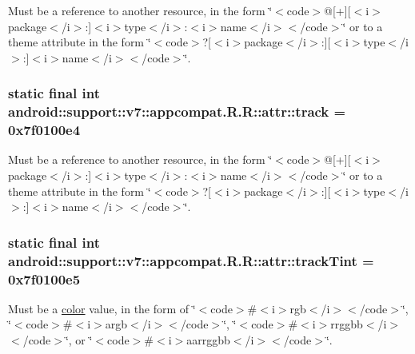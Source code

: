 Must be a reference to another resource, in the form \char`\"{}$<$code$>$@\mbox{[}+\mbox{]}\mbox{[}$<$i$>$package$<$/i$>$:\mbox{]}$<$i$>$type$<$/i$>$:$<$i$>$name$<$/i$>$$<$/code$>$\char`\"{} or to a theme attribute in the form \char`\"{}$<$code$>$?\mbox{[}$<$i$>$package$<$/i$>$:\mbox{]}\mbox{[}$<$i$>$type$<$/i$>$:\mbox{]}$<$i$>$name$<$/i$>$$<$/code$>$\char`\"{}. \hypertarget{classandroid_1_1support_1_1v7_1_1appcompat_1_1_r_1_1attr_1c6c319b2b5a130b26a8bdc55da06266}{
\subsubsection[{track}]{\setlength{\rightskip}{0pt plus 5cm}static final int android::support::v7::appcompat.R.R::attr::track = 0x7f0100e4}}
\label{classandroid_1_1support_1_1v7_1_1appcompat_1_1_r_1_1attr_1c6c319b2b5a130b26a8bdc55da06266}


Must be a reference to another resource, in the form \char`\"{}$<$code$>$@\mbox{[}+\mbox{]}\mbox{[}$<$i$>$package$<$/i$>$:\mbox{]}$<$i$>$type$<$/i$>$:$<$i$>$name$<$/i$>$$<$/code$>$\char`\"{} or to a theme attribute in the form \char`\"{}$<$code$>$?\mbox{[}$<$i$>$package$<$/i$>$:\mbox{]}\mbox{[}$<$i$>$type$<$/i$>$:\mbox{]}$<$i$>$name$<$/i$>$$<$/code$>$\char`\"{}. \hypertarget{classandroid_1_1support_1_1v7_1_1appcompat_1_1_r_1_1attr_3690d36eb6dbd4c35f116ac1dd3fce4e}{
\subsubsection[{trackTint}]{\setlength{\rightskip}{0pt plus 5cm}static final int android::support::v7::appcompat.R.R::attr::trackTint = 0x7f0100e5}}
\label{classandroid_1_1support_1_1v7_1_1appcompat_1_1_r_1_1attr_3690d36eb6dbd4c35f116ac1dd3fce4e}


Must be a \hyperlink{classandroid_1_1support_1_1v7_1_1appcompat_1_1_r_1_1color}{color} value, in the form of \char`\"{}$<$code$>$\#$<$i$>$rgb$<$/i$>$$<$/code$>$\char`\"{}, \char`\"{}$<$code$>$\#$<$i$>$argb$<$/i$>$$<$/code$>$\char`\"{}, \char`\"{}$<$code$>$\#$<$i$>$rrggbb$<$/i$>$$<$/code$>$\char`\"{}, or \char`\"{}$<$code$>$\#$<$i$>$aarrggbb$<$/i$>$$<$/code$>$\char`\"{}. 

